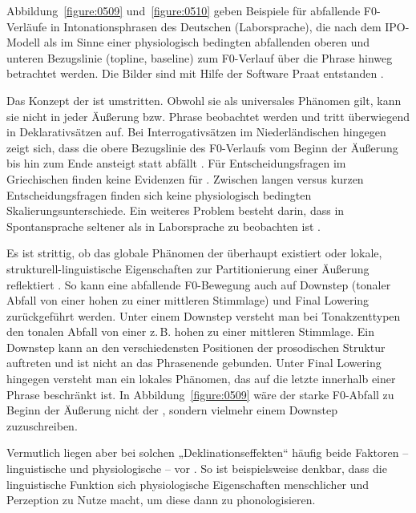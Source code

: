 Abbildung~\ref{figure:0509} und~\ref{figure:0510} geben Beispiele für abfallende F0-Verläufe in Intonationsphrasen des Deutschen (Laborsprache), die nach dem IPO-Modell als  im Sinne einer physiologisch bedingten abfallenden oberen und unteren Bezugslinie (topline, baseline) zum F0-Verlauf über die Phrase hinweg betrachtet werden. Die Bilder sind mit Hilfe der Software Praat entstanden \citep{praat2010}.

\largerpage
Das Konzept der  ist umstritten. Obwohl sie als universales Phänomen gilt, kann sie nicht in jeder Äußerung bzw. Phrase beobachtet werden \citep{Gilles2008} und tritt überwiegend in Deklarativsätzen auf. Bei Interrogativsätzen im Niederländischen hingegen zeigt sich, dass die obere Bezugslinie des F0-Verlaufs vom Beginn der Äußerung bis hin zum Ende ansteigt statt abfällt \citep{vanHeuven2000}. Für Entscheidungsfragen im Griechischen finden \citet[][66]{Arvaniti2009} keine Evidenzen für . Zwischen langen versus kurzen Entscheidungsfragen finden sich keine physiologisch bedingten Skalierungsunterschiede. Ein weiteres Problem besteht darin, dass  in Spontansprache seltener als in Laborsprache zu beobachten ist \citep{Vaissière1983}.


\newpage
Es ist strittig, ob das globale Phänomen der  überhaupt existiert oder lokale, strukturell-linguistische Eigenschaften zur Partitionierung einer Äußerung reflektiert \citep[u.a.][]{Pierrehumbert1979,Pierrehumbert1980,Ladd1984,Ladd2008,Möbius1993,Grabe1998,Arvaniti2009}. So kann eine abfallende F0-Bewegung auch auf Downstep (tonaler Abfall von einer hohen zu einer mittleren Stimmlage) und Final Lowering zurückgeführt werden. Unter einem Downstep versteht man bei Tonakzenttypen den tonalen Abfall von einer z.\,B. hohen zu einer mittleren Stimmlage. Ein Downstep kann an den verschiedensten Positionen der prosodischen Struktur auftreten und ist nicht an das Phrasenende gebunden. Unter Final Lowering hingegen versteht man ein lokales Phänomen, das auf die letzte  innerhalb einer Phrase beschränkt ist. In Abbildung~\ref{figure:0509} wäre der starke F0-Abfall zu Beginn der Äußerung nicht der , sondern vielmehr einem Downstep zuzuschreiben.

Vermutlich liegen aber bei solchen „Deklinationseffekten“ häufig beide Faktoren -- linguistische und physiologische -- vor \citep[][44]{Arvaniti2009}. So ist beispielsweise denkbar, dass die linguistische Funktion sich physiologische Eigenschaften menschlicher  und Perzeption zu Nutze macht, um diese dann zu phonologisieren. 

